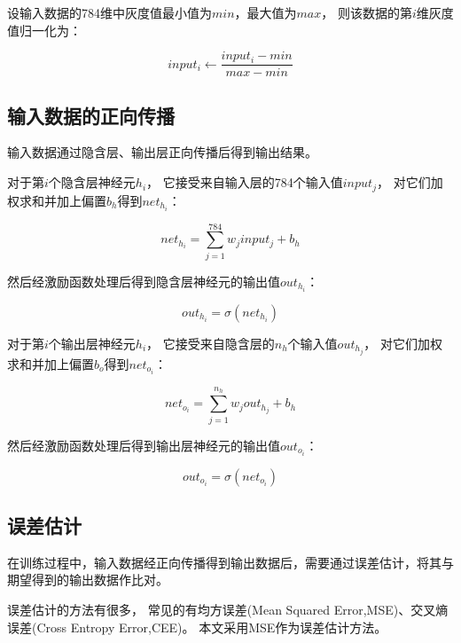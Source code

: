 \documentclass[forprint]{WHUBachelor}
\begin{document}
      设输入数据的784维中灰度值最小值为$min$，最大值为$max$，
      则该数据的第$i$维灰度值归一化为：

      \begin{equation}
        input_{i}\gets \frac{input_{i}-min}{max-min}
      \end{equation}

    \subsection{输入数据的正向传播}

      输入数据通过隐含层、输出层正向传播后得到输出结果。

      对于第$i$个隐含层神经元$h_i$，
      它接受来自输入层的784个输入值$input_j$，
      对它们加权求和并加上偏置$b_h$得到$net_{h_i}$：

      \begin{equation}
        net_{h_i}=\sum_{j=1}^{784}{w_jinput_j}+b_h
      \end{equation}

      然后经激励函数处理后得到隐含层神经元的输出值$out_{h_i}$：

      \begin{equation}
        out_{h_i}=\sigma(net_{h_i})
      \end{equation}

      对于第$i$个输出层神经元$h_i$，
      它接受来自隐含层的$n_h$个输入值$out_{h_j}$，
      对它们加权求和并加上偏置$b_o$得到$net_{o_i}$：

      \begin{equation}
        net_{o_i}=\sum_{j=1}^{n_h}{w_jout_{h_j}}+b_h
      \end{equation}

      然后经激励函数处理后得到输出层神经元的输出值$out_{o_i}$：

      \begin{equation}
        out_{o_i}=\sigma(net_{o_i})
      \end{equation}

    \subsection{误差估计}
    
    在训练过程中，输入数据经正向传播得到输出数据后，需要通过误差估计，将其与期望得到的输出数据作比对。

    误差估计的方法有很多，
    常见的有均方误差(Mean Squared Error,MSE)、交叉熵误差(Cross Entropy Error,CEE)。
    本文采用MSE作为误差估计方法。
\end{document}

